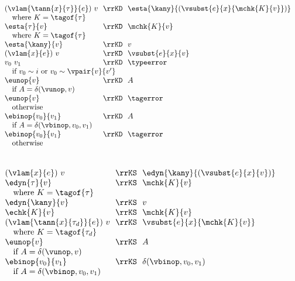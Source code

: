 \begin{flushleft}
\begin{minipage}[t]{\columnwidth}
\\
$\begin{array}{l@{~~}c@{~~}l}
  (\vlam{\tann{x}{\tau}}{e})~v & \rrKD & \esta{\kany}{(\vsubst{e}{x}{\mchk{K}{v}})}
\\ \multicolumn{3}{l}{\mbox{\quad where $K = \tagof{\tau}$}}
\\
  \esta{\tau}{v} & \rrKD & \mchk{K}{v}
\\ \multicolumn{3}{l}{\mbox{\quad where $K = \tagof{\tau}$}}
\\
  \esta{\kany}{v} & \rrKD & v
\\
  (\vlam{x}{e})~v & \rrKD & \vsubst{e}{x}{v}
\\
  v_0~v_1 & \rrKD & \typeerror
\\\multicolumn{3}{l}{\mbox{\quad if $v_0 \sim i$ or $v_0 \sim \vpair{v}{v'}$}}
\\
  \eunop{v} & \rrKD & A
\\\multicolumn{3}{l}{\mbox{\quad if $A = \delta(\vunop, v)$}}
\\
  \eunop{v} & \rrKD & \tagerror
\\\multicolumn{3}{l}{\mbox{\quad otherwise}}
\\
  \ebinop{v_0}{v_1} & \rrKD & A
\\\multicolumn{3}{l}{\mbox{\quad if $A = \delta(\vbinop, v_0, v_1)$}}
\\
  \ebinop{v_0}{v_1} & \rrKD & \tagerror
\\\multicolumn{3}{l}{\mbox{\quad otherwise}}
\end{array}$
\end{minipage}%
\hspace{\columnsep}\begin{minipage}[t]{\columnwidth}
\medskip
{}\\
$\begin{array}{l@{~~}c@{~~}l}
  (\vlam{x}{e})~v & \rrKS & \edyn{\kany}{(\vsubst{e}{x}{v})}
\\
  \edyn{\tau}{v} & \rrKS & \mchk{K}{v}
\\ \multicolumn{3}{l}{\mbox{\quad where $K = \tagof{\tau}$}}
\\
  \edyn{\kany}{v} & \rrKS & v
\\
  \echk{K}{v} & \rrKS & \mchk{K}{v}
\\
  (\vlam{\tann{x}{\tau_d}}{e})~v & \rrKS & \vsubst{e}{x}{\mchk{K}{v}}
\\ \multicolumn{3}{l}{\mbox{\quad where $K = \tagof{\tau_d}$}}
\\
  \eunop{v} & \rrKS & A
\\ \multicolumn{3}{l}{\mbox{\quad if $A = \delta(\vunop, v)$}}
\\
  \ebinop{v_0}{v_1} & \rrKS & \delta(\vbinop, v_0, v_1)
\\ \multicolumn{3}{l}{\mbox{\quad if $A = \delta(\vbinop, v_0, v_1)$}}
\end{array}$


\end{minipage}
\end{flushleft}
